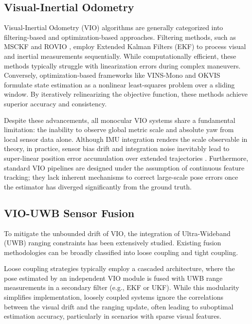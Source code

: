 \documentclass{svproc}
\begin{document}
\subsection{Visual-Inertial Odometry}

Visual-Inertial Odometry (VIO) algorithms are generally categorized into filtering-based and optimization-based approaches. Filtering methods, such as MSCKF \cite{mourikis2007multi} and ROVIO \cite{bloesch2015robust}, employ Extended Kalman Filters (EKF) to process visual and inertial measurements sequentially. While computationally efficient, these methods typically struggle with linearization errors during complex maneuvers. Conversely, optimization-based frameworks like VINS-Mono \cite{qn2018vins} and OKVIS \cite{leutenegger2015keyframe} formulate state estimation as a nonlinear least-squares problem over a sliding window. By iteratively relinearizing the objective function, these methods achieve superior accuracy and consistency.

Despite these advancements, all monocular VIO systems share a fundamental limitation: the inability to observe global metric scale and absolute yaw from local sensor data alone. Although IMU integration renders the scale observable in theory, in practice, sensor bias drift and integration noise inevitably lead to super-linear position error accumulation over extended trajectories \cite{lynen2013robust}. Furthermore, standard VIO pipelines are designed under the assumption of continuous feature tracking; they lack inherent mechanisms to correct large-scale pose errors once the estimator has diverged significantly from the ground truth.

\subsection{VIO-UWB Sensor Fusion}

To mitigate the unbounded drift of VIO, the integration of Ultra-Wideband (UWB) ranging constraints has been extensively studied. Existing fusion methodologies can be broadly classified into loose coupling and tight coupling.

Loose coupling strategies \cite{lynen2013robust,guo2016ultra} typically employ a cascaded architecture, where the pose estimated by an independent VIO module is fused with UWB range measurements in a secondary filter (e.g., EKF or UKF). While this modularity simplifies implementation, loosely coupled systems ignore the correlations between the visual drift and the ranging update, often leading to suboptimal estimation accuracy, particularly in scenarios with sparse visual features.
\end{document}
